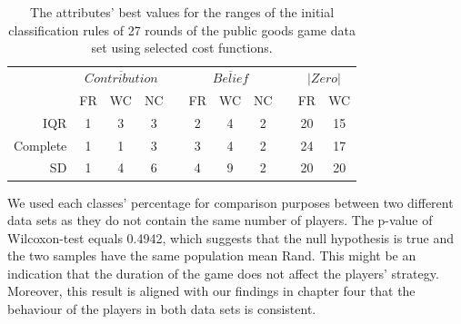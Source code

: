 \begin{table}[!h]
    \small
    \centering
    
    \caption{The attributes' best values for the ranges of the initial classification rules of 27 rounds of the public goods game data set using selected cost functions.}
    \label{tab:bestPGG27DataSets}
    \begin{tabular}{@{}rcccccccccc@{}}
        \toprule
        & \multicolumn{3}{c}{\textbf{$\overline{Contribution}$}} &  \phantom{abc}& \multicolumn{3}{c}{\textbf{$\overline{Belief}$}} &  \phantom{abc}& \multicolumn{2}{c}{\textbf{$\left |Zero\right |$}} \\
        
        \cmidrule{2-4} \cmidrule{6-8} \cmidrule{10-11}
        
        & FR                & WC                & NC    & \phantom{abc}           & FR              & WC              & NC     & \phantom{abc}        & FR                        & WC                        \\ \midrule

        IQR & 
        1    & 3   & 3 & \phantom{abc}           
        & 2  & 4   & 2 & \phantom{abc}        
        & 20   & 15                         \\
        
        Complete & 
        1  & 1  & 3   & \phantom{abc}           
        & 3  & 4  & 2   & \phantom{abc}        
        & 24  & 17                         \\
        
        
        SD & 
        1  & 4  & 6 & \phantom{abc}           
        & 4  & 9  & 2 & \phantom{abc}        
        & 20  & 20    \\
        
        \bottomrule                        
    \end{tabular}
\end{table}


We used each classes' percentage for comparison purposes between two different data sets as they do not contain the same number of players. The p-value of Wilcoxon-test equals 0.4942, which suggests that the null hypothesis is true and the two samples have the same population mean Rand. This might be an indication that the duration of the game does not affect the players' strategy. Moreover, this result is aligned with our findings in chapter four that the behaviour of the players in both data sets is consistent.

